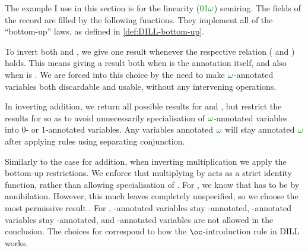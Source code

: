 \begin{example}\label{def:01w-inv}
  The example  I use in this section is for the
  linearity ($\instDILL$) semiring.
  The fields of the record are filled by the following functions.
  They implement all of the ``bottom-up'' laws, as defined in
  \cref{def:DILL-bottom-up}.

  To invert both  and
  , we give one result whenever the respective
  relation ( \AgdaDatatype{$\leq$} 
  and  \AgdaDatatype{$\leq$} ) holds.
  This means giving a result both when  is the annotation itself,
  and also when  is \AgdaInductiveConstructor{$\omega$\#}.
  We are forced into this choice by the need to make $\gr\omega$-annotated
  variables both discardable and usable, without any intervening operations.

  \noindent
  \begin{minipage}[t]{0.5\textwidth}
  \end{minipage}
  \begin{minipage}[t]{0.5\textwidth}
  \end{minipage}

  In inverting addition, we return all possible results for
   and , but
  restrict the results for \AgdaInductiveConstructor{$\omega$\#} so as to avoid
  unnecessarily specialisation of $\gr\omega$-annotated variables into $0$- or
  $1$-annotated variables.
  Any variables annotated $\gr\omega$ will stay annotated $\gr\omega$ after
  applying rules using separating conjunction.

  \begin{samepage}
  \end{samepage}

  Similarly to the case for addition, when inverting multiplication we apply
  the bottom-up restrictions.
  We enforce that multiplying by  acts as a strict
  identity function, rather than allowing specialisation of
  \AgdaInductiveConstructor{$\omega$\#}.
  For  \AgdaSymbol{=} , we know that
   has to be  by annihilation.
  However, this much leaves  completely unspecified, so we choose
  the most permissive result \AgdaInductiveConstructor{$\omega$\#}.
  For  \AgdaSymbol{=} \AgdaInductiveConstructor{$\omega$\#},
  -annotated variables stay
  -annotated,
  \AgdaInductiveConstructor{$\omega$\#}-annotated variables stay
  \AgdaInductiveConstructor{$\omega$\#}-annotated, and
  -annotated variables are not allowed in the
  conclusion.
  The choices for
   \AgdaSymbol{=} \AgdaInductiveConstructor{$\omega$\#} correspond
  to how the $\oc$-introduction rule in DILL works.


\end{example}
